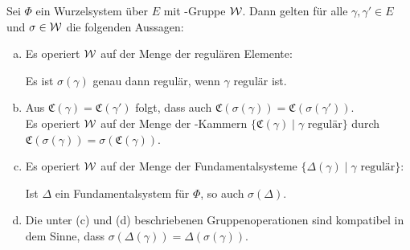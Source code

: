 \begin{prop}
  \label{prop:groupOp}
  Sei $\Phi$ ein Wurzelsystem über $E$ mit \weyl\hyp{}Gruppe $\mathcal{W}$.
  Dann gelten für alle $\gamma, \gamma' \in E$ und $\sigma \in \mathcal{W}$ die folgenden Aussagen:
  \begin{enumerate}[(a)]
    \item Es operiert $\mathcal{W}$ auf der Menge der regulären Elemente: 
      \begin{addmargin}[2em]{2em}
        Es ist $\sigma(\gamma)$ genau dann regulär, wenn $\gamma$ regulär ist.
      \end{addmargin}
      
    \item Aus $\mathfrak{C}(\gamma) = \mathfrak{C}(\gamma')$ folgt, dass auch $\mathfrak{C}(\sigma(\gamma)) = \mathfrak{C}(\sigma(\gamma'))$. \\
      Es operiert $\mathcal{W}$ auf der Menge der \weyl\hyp{}Kammern $\{\mathfrak{C}(\gamma) \mid \gamma \text{ regulär}\}$ durch $\mathfrak{C}(\sigma(\gamma)) = \sigma(\mathfrak{C}(\gamma))$.

    \item Es operiert $\mathcal{W}$ auf der Menge der Fundamentalsysteme $\{\Delta(\gamma) \mid \gamma \text{ regulär}\}$: 
      \begin{addmargin}[2em]{2em}
        Ist $\Delta$ ein Fundamentalsystem für $\Phi$, so auch $\sigma(\Delta)$. 
      \end{addmargin}

    \item Die unter (c) und (d) beschriebenen Gruppenoperationen sind kompatibel in dem Sinne, dass 
      $\sigma(\Delta(\gamma)) = \Delta(\sigma(\gamma))$.
  \end{enumerate}
\end{prop}

